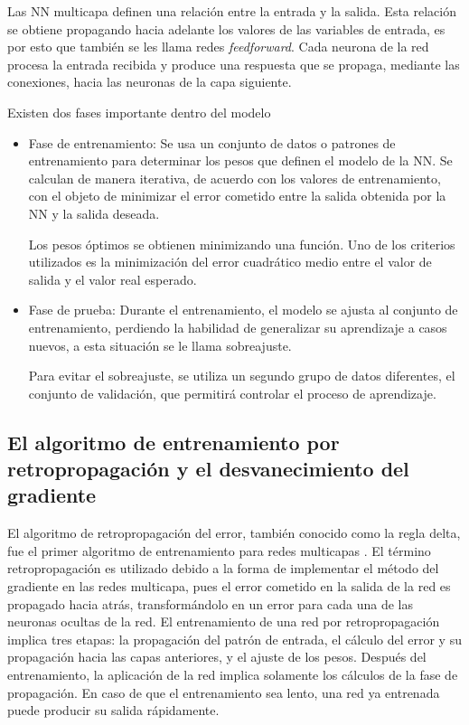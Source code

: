 Las NN multicapa definen una relación entre la entrada y la salida. Esta relación se obtiene propagando hacia adelante los valores de las variables de entrada, es por esto que también se les llama redes {\em feedforward}. Cada neurona de la red procesa la entrada recibida y produce una respuesta que se propaga, mediante las conexiones, hacia las neuronas de la capa siguiente.

Existen dos fases importante dentro del modelo
\begin{itemize}
	\item Fase de entrenamiento: Se usa un conjunto de datos o patrones de entrenamiento para determinar los pesos que definen el modelo de la NN. Se calculan de manera iterativa, de acuerdo con los valores de entrenamiento, con el objeto de minimizar el error cometido entre la salida obtenida por la NN y la salida deseada.

	Los pesos óptimos se obtienen minimizando una función. Uno de los criterios utilizados es la minimización del error cuadrático medio entre el valor de salida y el valor real esperado.

	\item Fase de prueba: Durante el entrenamiento, el modelo se ajusta al conjunto de entrenamiento, perdiendo la habilidad de generalizar su aprendizaje a casos nuevos, a esta situación se le llama sobreajuste.

	Para evitar el sobreajuste, se utiliza un segundo grupo de datos diferentes, el conjunto de validación, que permitirá controlar el proceso de aprendizaje.
\end{itemize}


\subsection{El algoritmo de entrenamiento por retropropagación y el desvanecimiento del gradiente}
El algoritmo de retropropagación del error, también conocido como la regla delta, fue el primer algoritmo de entrenamiento para redes multicapas  \cite{Werbos1974, Rumelhart1986}. El término retropropagación es utilizado debido a la forma de implementar el método del gradiente en las redes multicapa, pues el error cometido en la salida de la red es propagado hacia atrás, transformándolo en un error para cada una de las neuronas ocultas de la red. El entrenamiento de una red por retropropagación implica tres etapas: la propagación del patrón de entrada, el cálculo del error y su propagación hacia las capas anteriores, y el ajuste de los pesos. Después del entrenamiento, la aplicación de la red implica solamente los cálculos de la fase de propagación. En caso de que el entrenamiento sea lento, una red ya entrenada puede producir su salida rápidamente.


